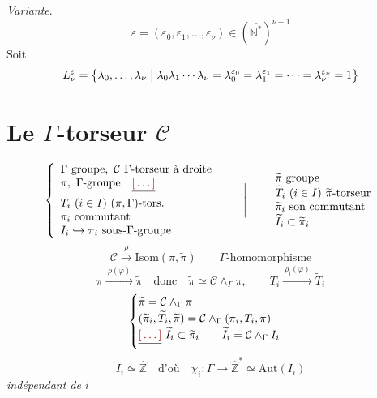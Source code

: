 \documentclass[11pt,a4paper]{article}
\begin{document}
\emph{Variante}.  \ill{}
\[
  \varepsilon = (\varepsilon_{0}, \varepsilon_{1}, \dots, \varepsilon_{\nu})
  \in (\overline{\mathbb{N}^{*}})^{\nu+1}
\]
Soit
\[
  L_{\nu}^{\varepsilon} = \bigl\{\lambda_{0}, \dots, \lambda_{\nu} \bigm|
  \lambda_{0}\lambda_{1}\cdots\lambda_{\nu}
  = \lambda_{0}^{\varepsilon_{0}} = \lambda_{1}^{\varepsilon_{1}} = \dots
  = \lambda_{\nu}^{\varepsilon_{\nu}} = 1\bigr\}
\]

\section{Le $\Gamma$-torseur $\mathcal{C}$}


\[
  \left\{
  \begin{array}{l}
    \Gamma \text{ groupe},\ \mathcal{C}\ \Gamma\text{-torseur à droite}\\
    \pi,\ \Gamma\text{-groupe}\quad \struck{\ill{}}\\
    T_{i}\ (i \in I)\ (\pi, \Gamma)\text{-tors.}\\
    \pi_{i}\ \text{commutant}\\
    I_{i} \hookrightarrow \pi_{i}\ \text{sous-}\Gamma\text{-groupe}
  \end{array}
  \right.
  \qquad\Bigg|\qquad
  \begin{array}{l}
    \widetilde{\pi}\ \text{groupe}\\
    \widetilde{T}_{i}\ (i \in I)\ \widetilde{\pi}\text{-torseur}\\
    \widetilde{\pi}_{i}\ \text{son commutant}\\
    \widetilde{I}_{i} \subset \widetilde{\pi}_{i}
  \end{array}
\]
\[
  \mathcal{C} \xrightarrow{\ \rho\ } \mathrm{Isom}(\pi, \widetilde{\pi})
  \qquad \Gamma\text{-homomorphisme}
\]
\[
  \pi \xrightarrow{\ \rho(\varphi)\ } \widetilde{\pi}
  \quad\text{donc}\quad \widetilde{\pi} \simeq \mathcal{C} \wedge_{\Gamma} \pi,
  \qquad
  T_{i} \xrightarrow{\ \rho_{i}(\varphi)\ } \widetilde{T}_{i}
\]
\[
  \begin{cases}
    \widetilde{\pi} = \mathcal{C} \wedge_{\Gamma} \pi\\
    (\widetilde{\pi}_{i}, \widetilde{T}_{i}, \widetilde{\pi}) = \mathcal{C} \wedge_{\Gamma} (\pi_{i}, T_{i}, \pi)\\
    \struck{\ill{}}\ \widetilde{I}_{i} \subset \widetilde{\pi}_{i}
      \qquad \widetilde{I}_{i} = \mathcal{C} \wedge_{\Gamma} I_{i}
  \end{cases}
\]
\[
  \widetilde{I}_{i} \simeq \widehat{\mathbb{Z}}
  \quad\text{d'où}\quad
  \chi_{i} : \Gamma \to \widehat{\mathbb{Z}}^{*} \simeq \mathrm{Aut}(I_{i})
\]
\emph{indépendant de $i$}
\end{document}
